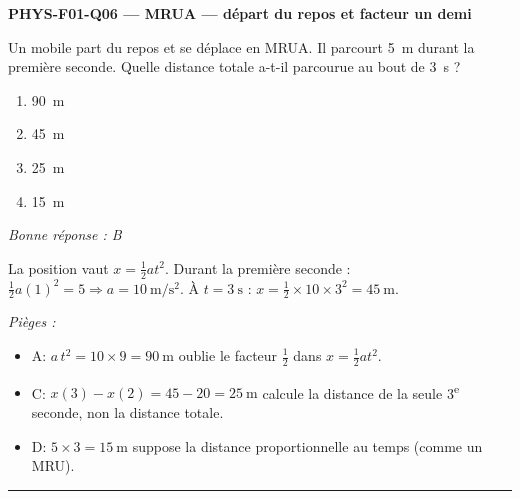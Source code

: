 \documentclass[11pt,a4paper]{article}
\begin{document}
\noindent\textbf{PHYS-F01-Q06 --- MRUA --- départ du repos et facteur un demi}\par
Un mobile part du repos et se déplace en MRUA. Il parcourt \qty{5}{\metre} durant la première seconde. Quelle distance totale a-t-il parcourue au bout de \qty{3}{\second} ?
\begin{enumerate}[label=\Alph*)]
\item \qty{90}{\metre}
\item \qty{45}{\metre}
\item \qty{25}{\metre}
\item \qty{15}{\metre}
\end{enumerate}
\textit{Bonne réponse : B}\par
La position vaut $x=\frac12 a t^2$. Durant la première seconde : $\frac12 a(1)^2=5\Rightarrow a=\qty{10}{\metre\per\second\squared}$. À $t=\qty{3}{\second}$ : $x=\frac12\times 10\times 3^2=\qty{45}{\metre}$.\par
\textit{Pièges :}
\begin{itemize}
\item A: $a\,t^2=10\times 9=\qty{90}{\metre}$ oublie le facteur $\frac12$ dans $x=\frac12 a t^2$.
\item C: $x(3)-x(2)=45-20=\qty{25}{\metre}$ calcule la distance de la seule 3\textsuperscript{e} seconde, non la distance totale.
\item D: $5\times 3=\qty{15}{\metre}$ suppose la distance proportionnelle au temps (comme un MRU).
\end{itemize}
\vspace{8pt}\hrule\vspace{8pt}
\end{document}
